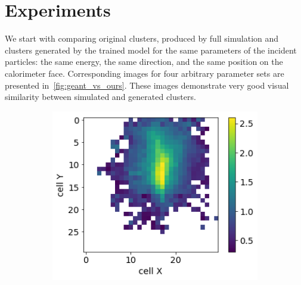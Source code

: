 \section{Experiments}

We start with comparing original clusters, produced by full \geant
simulation and clusters generated by the trained model for the same
 parameters of the incident particles: the same energy, the same direction,
 and the same position on the calorimeter face. Corresponding images
 for four arbitrary parameter sets are presented
 in~\cref{fig:geant_vs_ours}. These images demonstrate very good
 visual similarity between simulated and generated clusters.

\begin{figure}
\captionsetup[subfigure]{justification=centering}
  \centering
  \begin{subfigure}{0.24\textwidth}
    \centering
    \includegraphics[width=1\textwidth]{figures/1_real.png}
  \end{subfigure}
  \begin{subfigure}{0.24\textwidth}
    \centering

\end{subfigure}
\end{figure}
